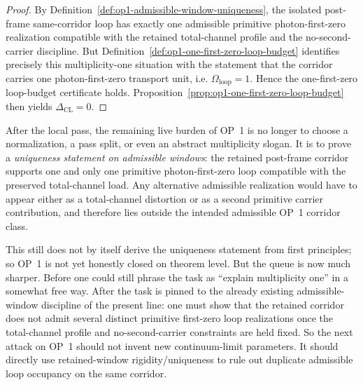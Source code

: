 \begin{proof}
By Definition~\ref{def:op1-admissible-window-uniqueness}, the isolated post-frame same-corridor loop has exactly one admissible primitive photon-first-zero realization compatible with the retained total-channel profile and the no-second-carrier discipline. But Definition~\ref{def:op1-one-first-zero-loop-budget} identifies precisely this multiplicity-one situation with the statement that the corridor carries one photon-first-zero transport unit, i.e. \(\Omega_{\mathrm{loop}}=1\). Hence the one-first-zero loop-budget certificate holds. Proposition~\ref{prop:op1-one-first-zero-loop-budget} then yields \(\Delta_{\mathrm{CL}}=0\).
\end{proof}

\begin{corollary}
\label{cor:op1-live-burden-after-r10}
After the local pass, the remaining live burden of OP~1 is no longer to choose a normalization, a pass split, or even an abstract multiplicity slogan. It is to prove a \emph{uniqueness statement on admissible windows}: the retained post-frame corridor supports one and only one primitive photon-first-zero loop compatible with the preserved total-channel load. Any alternative admissible realization would have to appear either as a total-channel distortion or as a second primitive carrier contribution, and therefore lies outside the intended admissible OP~1 corridor class.
\end{corollary}

\begin{remark}
This still does not by itself derive the uniqueness statement from first principles; so OP~1 is not yet honestly closed on theorem level. But the queue is now much sharper. Before one could still phrase the task as ``explain multiplicity one'' in a somewhat free way. After the task is pinned to the already existing admissible-window discipline of the present line: one must show that the retained corridor does not admit several distinct primitive first-zero loop realizations once the total-channel profile and no-second-carrier constraints are held fixed. So the next attack on OP~1 should not invent new continuum-limit parameters. It should directly use retained-window rigidity/uniqueness to rule out duplicate admissible loop occupancy on the same corridor.
\end{remark}


